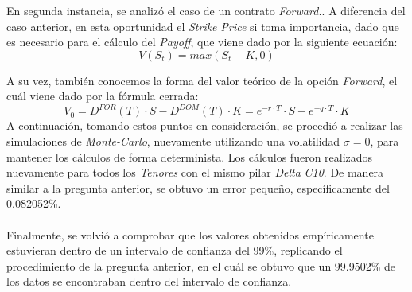 \noindent En segunda instancia, se analizó el caso de un contrato \textit{Forward.}. A diferencia del caso anterior, en esta oportunidad el \textit{Strike Price} si toma importancia, dado que es necesario para el cálculo del \textit{Payoff}, que viene dado por la siguiente ecuación:
\begin{equation}
    V(S_t)=max(S_t-K,0)
\end{equation}

\noindent A su vez, también conocemos la forma del valor teórico de la opción \textit{Forward}, el cuál viene dado por la fórmula cerrada:
\begin{equation}
    V_0=D^{FOR}(T)\cdot S- D^{DOM}(T)\cdot K = e^{-r\cdot T}\cdot S- e^{-q\cdot T}\cdot K
\end{equation}
\noindent A continuación, tomando estos puntos en consideración, se procedió a realizar las simulaciones de \textit{Monte-Carlo}, nuevamente utilizando una volatilidad $\sigma=0$, para mantener los cálculos de forma determinista. Los cálculos fueron realizados nuevamente para todos los \textit{Tenores} con el mismo pilar \textit{Delta} \textit{C10}. De manera similar a la pregunta anterior, se obtuvo un error pequeño, específicamente del 0.082052\%.\\\\
\noindent Finalmente, se volvió a comprobar que los valores obtenidos empíricamente estuvieran dentro de un intervalo de confianza del 99\%, replicando el procedimiento de la pregunta anterior, en el cuál se obtuvo que un 99.9502\% de los datos se encontraban dentro del intervalo de confianza.
\newpage